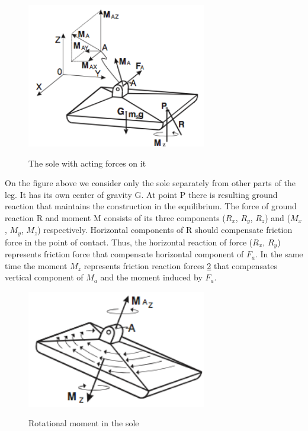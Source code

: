 \documentclass[12pt,a4paper]{report}
\begin{document}
		\begin{figure}[h!]
			\vspace{-0.2cm}
			\centering
			{\includegraphics[width=0.7\textwidth]{1}}
			\caption{The sole with acting forces on it}
			\label{fig:1}
			\vspace{-0.1cm}
		\end{figure}

		On the figure above we consider only the sole separately from other parts of the leg. It has its own center of gravity G. At point P there is resulting ground reaction that maintains the construction in the equilibrium. The force of ground reaction R and moment M consists of its three components ($R_x$, $R_y$, $R_z$) and ($M_x$, $M_y$, $M_z$) respectively. Horizontal components of R should compensate friction force in the point of contact. Thus, the horizontal reaction of force ($R_x$, $R_y$) represents 
		friction force that compensate horizontal component of $F_a$. In the same time the moment $M_z$ represents friction reaction forces \cref{fig:2} that compensates vertical component of $M_a$ and the moment induced by $F_a$. \cite{vukobratovic2004zero}

		\begin{figure}[h!]
			\vspace{-0.2cm}
			\centering
			{\includegraphics[width=0.7\textwidth]{2}}
			\caption{Rotational moment in the sole}
			\label{fig:2}
			\vspace{-0.1cm}
		\end{figure}
\end{document}
